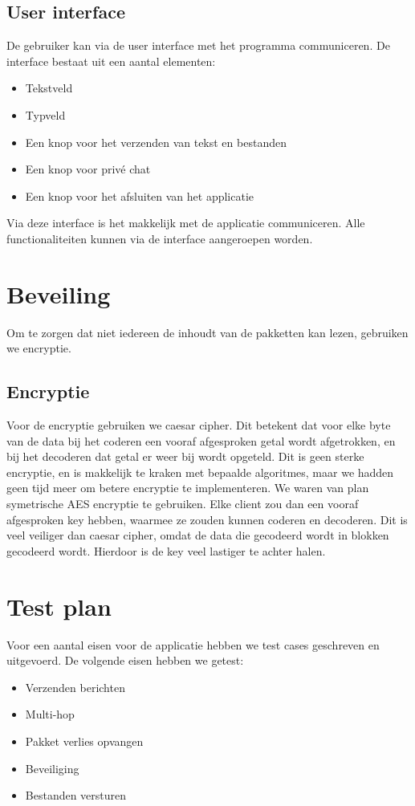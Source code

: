 \documentclass{article}
\begin{document}
\subsection{User interface}
De gebruiker kan via de user interface met het programma communiceren. De interface bestaat uit een aantal elementen:
\begin{itemize}
\item Tekstveld
\item Typveld
\item Een knop voor het verzenden van tekst en bestanden
\item Een knop voor priv\'{e} chat
\item Een knop voor het afsluiten van het applicatie
\end{itemize}

Via deze interface is het makkelijk met de applicatie communiceren. Alle functionaliteiten kunnen via de interface aangeroepen worden. 

\section{Beveiling}
Om te zorgen dat niet iedereen de inhoudt van de pakketten kan lezen, gebruiken we encryptie. 

\subsection{Encryptie}
Voor de encryptie gebruiken we caesar cipher. Dit betekent dat voor elke byte van de data bij het coderen een vooraf afgesproken getal wordt afgetrokken, en bij het decoderen dat getal er weer bij wordt opgeteld. Dit is geen sterke encryptie, en is makkelijk te kraken met bepaalde algoritmes, maar we hadden geen tijd meer om betere encryptie te implementeren. We waren van plan symetrische AES encryptie te gebruiken. Elke client zou dan een vooraf afgesproken key hebben, waarmee ze zouden kunnen coderen en decoderen. Dit is veel veiliger dan caesar cipher, omdat de data die gecodeerd wordt in blokken gecodeerd wordt. Hierdoor is de key veel lastiger te achter halen. \\

\section{Test plan}
Voor een aantal eisen voor de applicatie hebben we test cases geschreven en uitgevoerd. De volgende eisen hebben we getest:
\begin{itemize}
\item Verzenden berichten
\item Multi-hop
\item Pakket verlies opvangen
\item Beveiliging
\item Bestanden versturen
\end{itemize}
\end{document}
